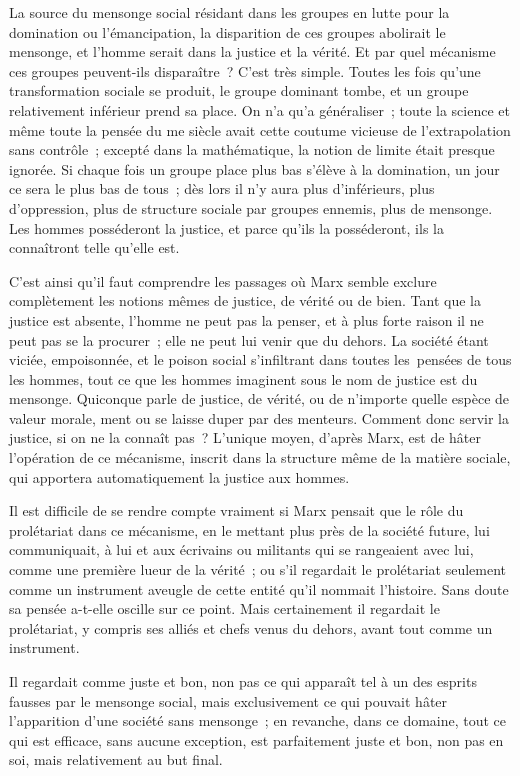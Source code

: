 \documentclass[french,twoside]{book} %
\begin{document}
La source du mensonge social résidant dans les groupes en lutte pour la domination ou l'émancipation, la disparition de ces groupes abolirait le mensonge, et l'homme serait dans la justice et la vérité. Et par quel mécanisme ces groupes peuvent-ils disparaître ? C'est très simple. Toutes les fois qu'une transformation sociale se produit, le groupe dominant tombe, et un groupe relativement inférieur prend sa place. On n'a qu'a généraliser ; toute la science et même toute la pensée du me siècle avait cette coutume vicieuse de l'extrapolation sans contrôle ; excepté dans la mathématique, la notion de limite était presque ignorée. Si chaque fois un groupe place plus bas s'élève à la domination, un jour ce sera le plus bas de tous ; dès lors il n'y aura plus d'inférieurs, plus d'oppression, plus de structure sociale par groupes ennemis, plus de mensonge. Les hommes posséderont la justice, et parce qu'ils la posséderont, ils la connaîtront telle qu'elle est.\par
C'est ainsi qu'il faut comprendre les passages où Marx semble exclure complètement les notions mêmes de justice, de vérité ou de bien. Tant que la justice est absente, l'homme ne peut pas la penser, et à plus forte raison il ne peut pas se la procurer ; elle ne peut lui venir que du dehors. La société étant viciée, empoisonnée, et le poison social s'infiltrant dans toutes les pensées de tous les hommes, tout ce que les hommes imaginent sous le nom de justice est du mensonge. Quiconque parle de justice, de vérité, ou de n'importe quelle espèce de valeur morale, ment ou se laisse duper par des menteurs. Comment donc servir la justice, si on ne la connaît pas ? L'unique moyen, d'après Marx, est de hâter l'opération de ce mécanisme, inscrit dans la structure même de la matière sociale, qui apportera automatiquement la justice aux hommes.\par
Il est difficile de se rendre compte vraiment si Marx pensait que le rôle du prolétariat dans ce mécanisme, en le mettant plus près de la société future, lui communiquait, à lui et aux écrivains ou militants qui se rangeaient avec lui, comme une première lueur de la vérité ; ou s'il regardait le prolétariat seulement comme un instrument aveugle de cette entité qu'il nommait l'histoire. Sans doute sa pensée a-t-elle oscille sur ce point. Mais certainement il regardait le prolétariat, y compris ses alliés et chefs venus du dehors, avant tout comme un instrument.\par
Il regardait comme juste et bon, non pas ce qui apparaît tel à un des esprits fausses par le mensonge social, mais exclusivement ce qui pouvait hâter l'apparition d'une société sans mensonge ; en revanche, dans ce domaine, tout ce qui est efficace, sans aucune exception, est parfaitement juste et bon, non pas en soi, mais relativement au but final.\par
\end{document}
